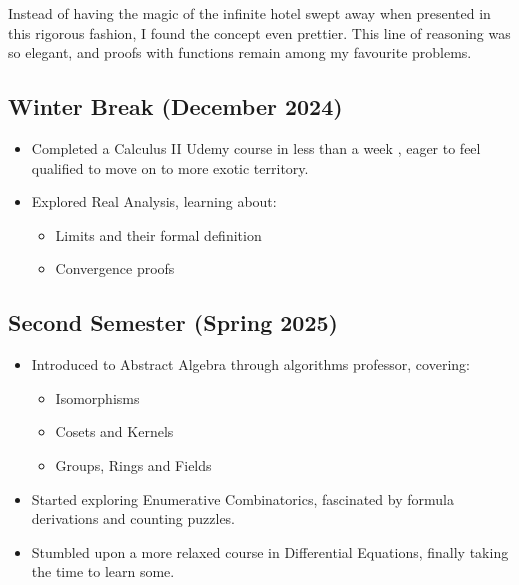 \documentclass{article}
\begin{document}
\noindent 
Instead of having the magic of the infinite hotel swept away when presented 
in this rigorous fashion, I found the concept even prettier. 
This line of reasoning was so elegant, and proofs with functions remain 
among my favourite problems.

\subsection{Winter Break (December 2024)}
\begin{itemize}
    \item Completed a Calculus II Udemy course in less than a week
        , eager to feel qualified to move on to more exotic territory.
    \item Explored Real Analysis, learning about:
    \begin{itemize}
        \item Limits and their formal definition
        \item Convergence proofs
    \end{itemize}
\end{itemize}

\subsection{Second Semester (Spring 2025)}
\begin{itemize}
    \item Introduced to Abstract Algebra through algorithms professor, covering:
    \begin{itemize}
        \item Isomorphisms
        \item Cosets and Kernels
        \item Groups, Rings and Fields
    \end{itemize}
    \item Started exploring Enumerative Combinatorics, 
        fascinated by formula derivations and counting puzzles.
    \item Stumbled upon a more relaxed course in Differential Equations, 
        finally taking the time to learn some.
\end{itemize}
\break
\end{document}
